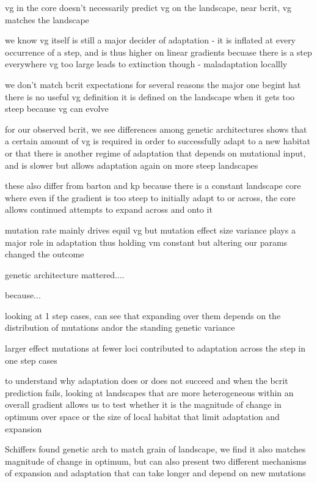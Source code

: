 vg in the core doesn't necessarily predict vg on the landscape, near bcrit, vg matches the landscape

we know vg itself is still a major decider of adaptation - it is inflated at every occurrence of a step, and is thus higher on linear gradients becuase there is a step everywhere
vg too large leads to extinction though - maladaptation locallly


we don't match bcrit expectations for several reasons
the major one begint hat there is no useful vg definition
it is defined on the landscape when it gets too steep
because vg can evolve

for our observed bcrit, we see differences among genetic architectures
shows that a certain amount of vg is required in order to successfully adapt to a new habitat
or that there is another regime of adaptation that depends on mutational input, and is slower but allows adaptation again on more steep landscapes

these also differ from barton and kp because there is a constant landscape core where even if the gradient is too steep to initially adapt to or across, the core allows continued attempts to expand across and onto it

mutation rate mainly drives equil vg
but mutation effect size variance plays a major role in adaptation
thus holding vm constant but altering our params changed the outcome

genetic architecture mattered....

because...

looking at 1 step cases, can see that expanding over them depends on the distribution of mutations and\/or the standing genetic variance

larger effect mutations at fewer loci contributed to adaptation across the step in one step cases




to understand why adaptation does or does not succeed and when the bcrit prediction fails, looking at landscapes that are more heterogeneous within an overall gradient allows us to test whether it is the magnitude of change in optimum over space or the size of local habitat that limit adaptation and expansion



Schiffers found genetic arch to match grain of landscape, we find it also matches magnitude of change in optimum, but can also present two different mechanisms of expansion and adaptation that can take longer and depend on new mutations


